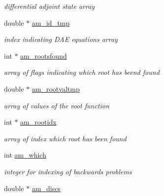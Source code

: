 \begin{DoxyCompactItemize}
\begin{DoxyCompactList}\small\item\em differential adjoint state array \end{DoxyCompactList}\item 
\hypertarget{struct_temp_data_a3ae8375babdd7bfd0b0b05a158f36b1a}{}double $\ast$ \hyperlink{struct_temp_data_a3ae8375babdd7bfd0b0b05a158f36b1a}{am\+\_\+id\+\_\+tmp}\label{struct_temp_data_a3ae8375babdd7bfd0b0b05a158f36b1a}

\begin{DoxyCompactList}\small\item\em index indicating D\+A\+E equations array \end{DoxyCompactList}\item 
int $\ast$ \hyperlink{struct_temp_data_a7aead84117fd84087a23d968ea56b542}{am\+\_\+rootsfound}
\begin{DoxyCompactList}\small\item\em array of flags indicating which root has beend found \end{DoxyCompactList}\item 
\hypertarget{struct_temp_data_aa6a5cd387c4d5257f9f8de9b04af666b}{}double $\ast$ \hyperlink{struct_temp_data_aa6a5cd387c4d5257f9f8de9b04af666b}{am\+\_\+rootvaltmp}\label{struct_temp_data_aa6a5cd387c4d5257f9f8de9b04af666b}

\begin{DoxyCompactList}\small\item\em array of values of the root function \end{DoxyCompactList}\item 
\hypertarget{struct_temp_data_a360ea220e712750c92bd3fc8b56230e2}{}int $\ast$ \hyperlink{struct_temp_data_a360ea220e712750c92bd3fc8b56230e2}{am\+\_\+rootidx}\label{struct_temp_data_a360ea220e712750c92bd3fc8b56230e2}

\begin{DoxyCompactList}\small\item\em array of index which root has been found \end{DoxyCompactList}\item 
\hypertarget{struct_temp_data_a961819e25ceef7e842c469cbedccb19f}{}int \hyperlink{struct_temp_data_a961819e25ceef7e842c469cbedccb19f}{am\+\_\+which}\label{struct_temp_data_a961819e25ceef7e842c469cbedccb19f}

\begin{DoxyCompactList}\small\item\em integer for indexing of backwards problems \end{DoxyCompactList}\item 
\hypertarget{struct_temp_data_a236419c9694ba93addaee96e347e84b9}{}double $\ast$ \hyperlink{struct_temp_data_a236419c9694ba93addaee96e347e84b9}{am\+\_\+discs}\label{struct_temp_data_a236419c9694ba93addaee96e347e84b9}


\end{DoxyCompactItemize}
